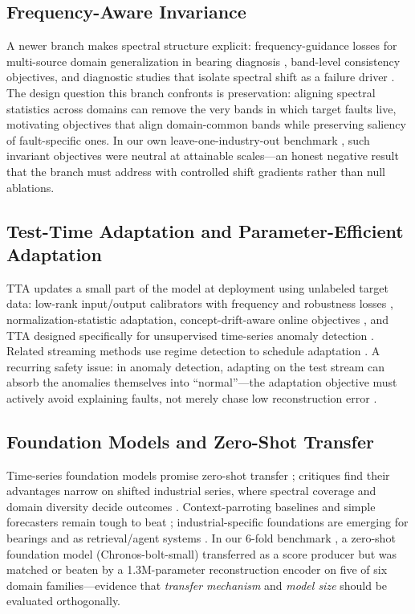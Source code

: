 \subsection{Frequency-Aware Invariance}
A newer branch makes spectral structure explicit: frequency-guidance losses for multi-source domain generalization in bearing diagnosis \cite{2502_00545}, band-level consistency objectives, and diagnostic studies that isolate spectral shift as a failure driver \cite{freqmatters2025,foundational2025}. The design question this branch confronts is preservation: aligning spectral statistics across domains can remove the very bands in which target faults live, motivating objectives that align domain-common bands while preserving saliency of fault-specific ones. In our own leave-one-industry-out benchmark \cite{our_scc}, such invariant objectives were neutral at attainable scales---an honest negative result that the branch must address with controlled shift gradients rather than null ablations.

\subsection{Test-Time Adaptation and Parameter-Efficient Adaptation}
TTA updates a small part of the model at deployment using unlabeled target data: low-rank input/output calibrators with frequency and robustness losses \cite{petsa2025}, normalization-statistic adaptation, concept-drift-aware online objectives \cite{2412_08435}, and TTA designed specifically for unsupervised time-series anomaly detection \cite{2312_11976}. Related streaming methods use regime detection to schedule adaptation \cite{2603_27814,2604_01845}. A recurring safety issue: in anomaly detection, adapting on the test stream can absorb the anomalies themselves into ``normal''---the adaptation objective must actively avoid explaining faults, not merely chase low reconstruction error \cite{2312_11976}.

\subsection{Foundation Models and Zero-Shot Transfer}
Time-series foundation models promise zero-shot transfer \cite{chronos2024}; critiques find their advantages narrow on shifted industrial series, where spectral coverage and domain diversity decide outcomes \cite{freqmatters2025,foundational2025,2502_03383,2510_26777}. Context-parroting baselines and simple forecasters remain tough to beat \cite{2505_11349}; industrial-specific foundations are emerging for bearings \cite{2504_01373} and as retrieval/agent systems \cite{2506_02081}. In our 6-fold benchmark \cite{our_scc}, a zero-shot foundation model (Chronos-bolt-small) transferred as a score producer but was matched or beaten by a 1.3M-parameter reconstruction encoder on five of six domain families---evidence that \emph{transfer mechanism} and \emph{model size} should be evaluated orthogonally.

